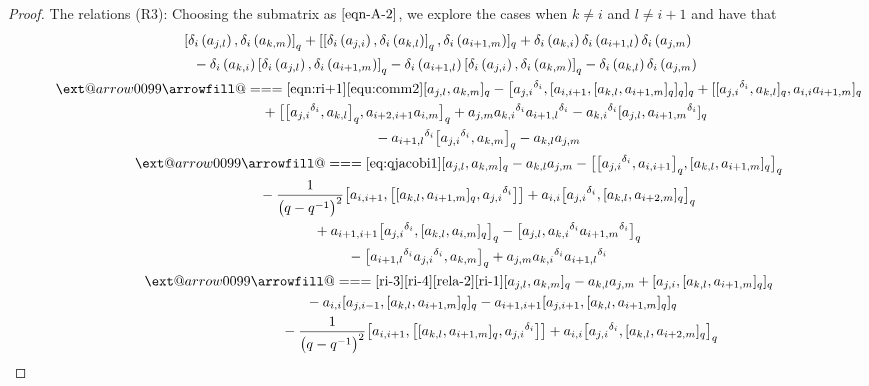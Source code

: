 \documentclass[10pt,a4paper]{amsart}
\makeatletter
\def\x@arrow{\DOTSB\Relbar}
\def\xlongequalsignfill@{\arrowfill@\x@arrow\Relbar\x@arrow}
\providecommand{\xlongequal}[2][]{%
	\ext@arrow 0099\xlongequalsignfill@{#1}{#2}}
\numberwithin{equation}{section}
\def\lr#1{\left[#1\right]}
\def\lrb#1{\left(#1\right)}
\def\d{\delta}
\def\A{\mathscr{A}}
\makeatother
\begin{document}
\begin{proof}
The relations (R3): Choosing the submatrix \smash{$\A_{j,k,i+1}^{i,l,m}$} as $\eqref{eqn-A-2}$, we explore the cases when $k\neq i$ and $l \neq i+1$ and have that
\begin{gather*}
 \lr{\d_i\lrb{a_{j,l}},\d_i\lrb{a_{k,m}}}_q +[\lr{\d_i\lrb{a_{j,i}},\d_i\lrb{a_{k,l}}}_q, \d_i\lrb{a_{i+1,m}}]_q+\d_i\lrb{a_{k,i}}\d_i\lrb{a_{i+1,l}}\d_i\lrb{a_{j,m}} \\
 \quad {}-\d_i\lrb{a_{k,i}}\lr{\d_i\lrb{a_{j,l}}, \d_i\lrb{a_{i+1,m}}}_q -\d_i\lrb{a_{i+1,l}}\lr{\d_i\lrb{a_{j,i}},\d_i\lrb{a_{k,m}}}_q -\d_i\lrb{a_{k,l}}\d_i\lrb{a_{j,m}}\\
\quad\qquad \xlongequal[\eqref{eqn:ri+1}]{\eqref{equ:comm2}} [a_{j,l},a_{k,m} ]_q - \bigl[{a_{j,i}}^{\d_i}, [a_{i,i+1}, [a_{k,l}, a_{i+1, m} ]_q ]_q ]_q+ [ [{a_{j,i}}^{\d_i}, a_{k,l} ]_q,a_{i,i}a_{i+1,m} ]_q\\
 \qquad\qquad\qquad\ \ {}+ \bigl[ \bigl[{a_{j,i}}^{\d_i},a_{k,l} \bigr]_q, a_{i+2,i+1}a_{i,m} \bigr]_q+a_{j,m}{a_{k,i}}^{\d_i}{a_{i+1,l}}^{\d_i} -{a_{k,i}}^{\d_i} [a_{j,l},{a_{i+1,m}}^{\d_i} ]_q \\
\quad\qquad\qquad \ \ {}-{a_{i+1,l}}^{\d_i} \bigl[{a_{j,i}}^{\d_i},a_{k,m} \bigr]_q -a_{k,l}a_{j,m} \\
\quad\qquad \xlongequal{\eqref{eq:qjacobi1}} [a_{j,l},a_{k,m} ]_q-a_{k,l}a_{j,m} - \bigl[ \bigl[{a_{j,i}}^{\d_i},a_{i,i+1} \bigr]_q, [a_{k,l},a_{i+1,m} ]_q \bigr]_q\\
\quad\qquad\qquad \ \ {}-\frac{1}{\bigl(q-q^{-1}\bigr)^2} \bigl[a_{i,i+1}, \bigl[ [a_{k,l},a_{i+1,m} ]_q,{a_{j,i}}^{\d_i} \bigr] \bigr] +a_{i,i} \bigl[{a_{j,i}}^{\d_i}, [a_{k,l},a_{i+2,m} ]_q \bigr]_q\\
\quad\qquad\qquad \ \ {}+a_{i+1,i+1} \bigl[{a_{j,i}}^{\d_i}, [a_{k,l},a_{i,m} ]_q \bigr]_q - \bigl[a_{j,l},{a_{k,i}}^{\d_i}{a_{i+1,m}}^{\d_i} \bigr]_q\\
 \quad\qquad\qquad\ \ {}- \bigl[{a_{i+1,l}}^{\d_i} {a_{j,i}}^{\d_i},a_{k,m} \bigr]_q +a_{j,m}{a_{k,i}}^{\d_i}{a_{i+1,l}}^{\d_i} \\
\quad\qquad \xlongequal[\substack{{\eqref{ri-3}\eqref{ri-4}}}] {\substack{{\eqref{rela-2}\eqref{ri-1}}}} [a_{j,l},a_{k,m} ]_q-a_{k,l}a_{j,m} + [a_{j,i}, [a_{k,l},a_{i+1,m} ]_q ]_q \\
\quad\qquad\qquad \qquad\ \ {}-a_{i,i} [a_{j,i-1}, [a_{k,l},a_{i+1,m} ]_q ]_q -a_{i+1,i+1} [a_{j,i+1}, [a_{k,l},a_{i+1,m} ]_q ]_q\\
\qquad\qquad\qquad \qquad\ \ {}-\frac{1}{\bigl(q-q^{-1}\bigr)^2} \bigl[a_{i,i+1}, \bigl[ [a_{k,l},a_{i+1,m} ]_q, {a_{j,i}}^{\d_i} \bigr] \bigr]+a_{i,i} \bigl[{a_{j,i}}^{\d_i}, [a_{k,l},a_{i+2,m} ]_q \bigr]_q \!\\

\end{gather*}
\end{proof}
\end{document}
